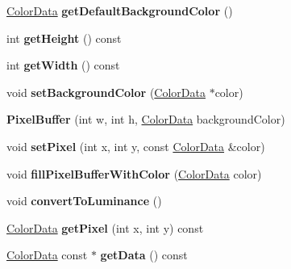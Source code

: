 \begin{DoxyCompactItemize}
\item 
\hypertarget{classPixelBuffer_a36649accdea429915280ba71a7976300}{\hyperlink{classColorData}{Color\-Data} {\bfseries get\-Default\-Background\-Color} ()}\label{classPixelBuffer_a36649accdea429915280ba71a7976300}

\item 
\hypertarget{classPixelBuffer_abd5685a6a23041ed9640da9370eb7839}{int {\bfseries get\-Height} () const }\label{classPixelBuffer_abd5685a6a23041ed9640da9370eb7839}

\item 
\hypertarget{classPixelBuffer_a26dc9286596d27cd416d34611c00602e}{int {\bfseries get\-Width} () const }\label{classPixelBuffer_a26dc9286596d27cd416d34611c00602e}

\item 
\hypertarget{classPixelBuffer_a1838bd976c9c98a79b0c2eb1246b816f}{void {\bfseries set\-Background\-Color} (\hyperlink{classColorData}{Color\-Data} $\ast$color)}\label{classPixelBuffer_a1838bd976c9c98a79b0c2eb1246b816f}

\item 
\hypertarget{classPixelBuffer_ae373904fcdd3c820677b959354b75410}{{\bfseries Pixel\-Buffer} (int w, int h, \hyperlink{classColorData}{Color\-Data} background\-Color)}\label{classPixelBuffer_ae373904fcdd3c820677b959354b75410}

\item 
\hypertarget{classPixelBuffer_abe673364dfceec95783e1dfb00ec9bd1}{void {\bfseries set\-Pixel} (int x, int y, const \hyperlink{classColorData}{Color\-Data} \&color)}\label{classPixelBuffer_abe673364dfceec95783e1dfb00ec9bd1}

\item 
\hypertarget{classPixelBuffer_a1bdab74553ab7d569629a42a808b4785}{void {\bfseries fill\-Pixel\-Buffer\-With\-Color} (\hyperlink{classColorData}{Color\-Data} color)}\label{classPixelBuffer_a1bdab74553ab7d569629a42a808b4785}

\item 
\hypertarget{classPixelBuffer_a73f0518c147ad7900a64b4ffa205b9fc}{void {\bfseries convert\-To\-Luminance} ()}\label{classPixelBuffer_a73f0518c147ad7900a64b4ffa205b9fc}

\item 
\hypertarget{classPixelBuffer_ae01450fb4e9824c1e93e92f4377e9924}{\hyperlink{classColorData}{Color\-Data} {\bfseries get\-Pixel} (int x, int y) const }\label{classPixelBuffer_ae01450fb4e9824c1e93e92f4377e9924}

\item 
\hypertarget{classPixelBuffer_afa8e098930154f21399cc7de6a2fff85}{\hyperlink{classColorData}{Color\-Data} const $\ast$ {\bfseries get\-Data} () const }\label{classPixelBuffer_afa8e098930154f21399cc7de6a2fff85}


\end{DoxyCompactItemize}
